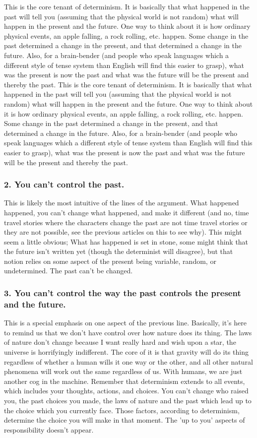 This is the core tenant of determinism. It is basically that what happened in the past will tell you (assuming that the physical world is not random) what will happen in the present and the future. One way to think about it is how ordinary physical events, an apple falling, a rock rolling, etc. happen. Some change in the past determined a change in the present, and that determined a change in the future. Also, for a brain-bender (and people who speak languages which a different style of tense system than English will find this easier to grasp), what was the present is now the past and what was the future will be the present and thereby the past. This is the core tenant of determinism. It is basically that what happened in the past will tell you (assuming that the physical world is not random) what will happen in the present and the future. One way to think about it is how ordinary physical events, an apple falling, a rock rolling, etc. happen. Some change in the past determined a change in the present, and that determined a change in the future. Also, for a brain-bender (and people who speak languages which a different style of tense system than English will find this easier to grasp), what was the present is now the past and what was the future will be the present and thereby the past.
\subsubsection{2. You can't control the past.}

This is likely the most intuitive of the lines of the argument. What happened happened, you can’t change what happened, and make it different (and no, time travel stories where the characters change the past are not time travel stories or they are not possible, see the previous articles on this to see why). This might seem a little obvious; What has happened is set in stone, some might think that the future isn't written yet (though the determinist will disagree), but that notion relies on some aspect of the present being variable, random, or undetermined. The past can't be changed. 
\subsubsection{3. You can't control the way the past controls the present and the future.}

This is a special emphasis on one aspect of the previous line. Basically, it's here to remind us that we don't have control over how nature does its thing. The laws of nature don't change because I want really hard and wish upon a star, the universe is horrifyingly indifferent. The core of it is that gravity will do its thing regardless of whether a human wills it one way or the other, and all other natural phenomena will work out the same regardless of us. With humans, we are just another cog in the machine. Remember that determinism extends to all events, which includes your thoughts, actions, and choices. You can't change who raised you, the past choices you made, the laws of nature and the past which lead up to the choice which you currently face. Those factors, according to determinism, determine the choice you will make in that moment. The 'up to you' aspects of responsibility doesn't appear.
